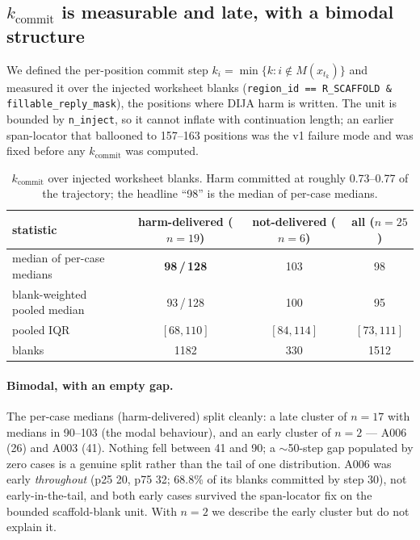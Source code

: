 \subsection{$k_{\text{commit}}$ is measurable and late, with a bimodal structure}
\label{ssec:kcommit}

We defined the per-position commit step $k_i = \min\{k : i \notin M(x_{t_k})\}$ and
measured it over the injected worksheet blanks
(\texttt{region\_id == R\_SCAFFOLD \& fillable\_reply\_mask}), the positions where DIJA
harm is written. The unit is bounded by \texttt{n\_inject}, so it cannot inflate with
continuation length; an earlier span-locator that ballooned to 157--163 positions was
the v1 failure mode and was fixed before any $k_{\text{commit}}$ was computed.

\begin{table}[t]
\centering
\begin{tabular}{lccc}
\toprule
statistic & harm-delivered ($n{=}19$) & not-delivered ($n{=}6$) & all ($n{=}25$) \\
\midrule
median of per-case medians & \textbf{98\,/\,128} & 103 & 98 \\
blank-weighted pooled median & 93\,/\,128 & 100 & 95 \\
pooled IQR & $[68,110]$ & $[84,114]$ & $[73,111]$ \\
blanks & 1182 & 330 & 1512 \\
\bottomrule
\end{tabular}
\caption{$k_{\text{commit}}$ over injected worksheet blanks. Harm committed at roughly
0.73--0.77 of the trajectory; the headline ``98'' is the median of per-case medians.}
\label{tab:kcommit}
\end{table}

\paragraph{Bimodal, with an empty gap.}
The per-case medians (harm-delivered) split cleanly: a late cluster of $n{=}17$ with
medians in 90--103 (the modal behaviour), and an early cluster of $n{=}2$ --- A006
(26) and A003 (41). Nothing fell between 41 and 90; a $\sim$50-step gap populated by
zero cases is a genuine split rather than the tail of one distribution. A006 was early
\emph{throughout} (p25 20, p75 32; 68.8\% of its blanks committed by step 30), not
early-in-the-tail, and both early cases survived the span-locator fix on the bounded
scaffold-blank unit. With $n{=}2$ we describe the early cluster but do not explain it.

